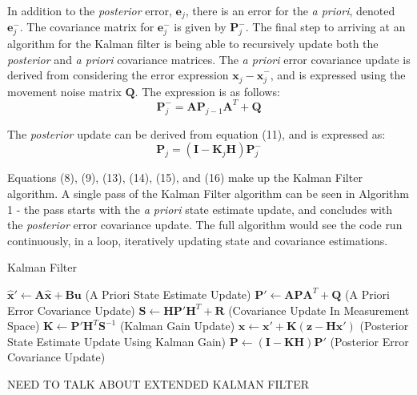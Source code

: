 \documentclass[a4paper]{article}
\begin{document}
In addition to the \textit{posterior} error, $\mathbf{e}_j$, there is an error for the \textit{a priori}, denoted $\mathbf{e}^-_j$. The covariance matrix for $\mathbf{e}^-_j$ is given by $\mathbf{P}^-_j$. The final step to arriving at an algorithm for the Kalman filter is being able to recursively update both the \textit{posterior} and \textit{a priori} covariance matrices. The \textit{a priori} error covariance update is derived from considering the error expression $\mathbf{x}_j - \hat{\mathbf{x}}^-_j$, and is expressed using the movement noise matrix $\mathbf{Q}$. The expression is as follows:
\begin{equation}
\mathbf{P}^-_j = \mathbf{A} \mathbf{P}_{j-1} \mathbf{A}^T + \mathbf{Q}
\end{equation}

The \textit{posterior} update can be derived from equation (11), and is expressed as:
\begin{equation}
\mathbf{P}_j = (\mathbf{I} - \mathbf{K}_j \mathbf{H}) \mathbf{P}^-_j
\end{equation}

Equations (8), (9), (13), (14), (15), and (16) make up the Kalman Filter algorithm. A single pass of the Kalman Filter algorithm can be seen in Algorithm 1 - the pass starts with the \textit{a priori} state estimate update, and concludes with the \textit{posterior} error covariance update. The full algorithm would see the code run continuously, in a loop, iteratively updating state and covariance estimations.
\begin{algorithm}
\caption{Kalman Filter}
\begin{algorithmic}[1]
\State $\hat{\mathbf{x}}' \gets \mathbf{A} \hat{\mathbf{x}} + \mathbf{B} \mathbf{u}$ (A Priori State Estimate Update)
\State $\mathbf{P}' \gets \mathbf{A} \mathbf{P} \mathbf{A}^T + \mathbf{Q}$ (A Priori Error Covariance Update)
\State $\mathbf{S} \gets \mathbf{H} \mathbf{P}' \mathbf{H}^T + \mathbf{R}$ (Covariance Update In Measurement Space)
\State $\mathbf{K} \gets \mathbf{P}' \mathbf{H}^T \mathbf{S}^{-1}$ (Kalman Gain Update)
\State $\mathbf{x} \gets \mathbf{x}' + \mathbf{K}(\mathbf{z} - \mathbf{H} \mathbf{x}')$ (Posterior State Estimate Update Using Kalman Gain)
\State $\mathbf{P} \gets (\mathbf{I} - \mathbf{K} \mathbf{H}) \mathbf{P}'$ (Posterior Error Covariance Update)
\end{algorithmic}
\end{algorithm}

NEED TO TALK ABOUT EXTENDED KALMAN FILTER
\end{document}
